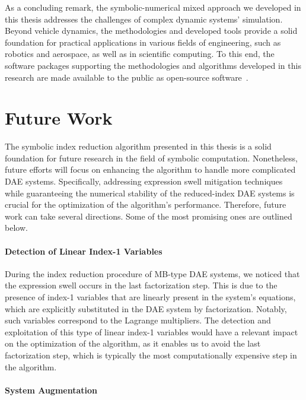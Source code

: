 As a concluding remark, the symbolic-numerical mixed approach we developed in this thesis addresses the challenges of complex dynamic systems' simulation. Beyond vehicle dynamics, the methodologies and developed tools provide a solid foundation for practical applications in various fields of engineering, such as robotics and aerospace, as well as in scientific computing. To this end, the software packages supporting the methodologies and algorithms developed in this research are made available to the public as open-source software~\cite{acme, enve, lime, limerickey, lem, last, indigo, trussme}.

\section{Future Work}
\label{chap6:sec:future_work}

The symbolic index reduction algorithm presented in this thesis is a solid foundation for future research in the field of symbolic computation. Nonetheless, future efforts will focus on enhancing the algorithm to handle more complicated \ac{DAE} systems. Specifically, addressing expression swell mitigation techniques while guaranteeing the numerical stability of the reduced-index \ac{DAE} systems is crucial for the optimization of the algorithm's performance. Therefore, future work can take several directions. Some of the most promising ones are outlined below.

\paragraph{Detection of Linear Index-1 Variables}

During the index reduction procedure of \ac{MB}-type \ac{DAE} systems, we noticed that the expression swell occurs in the last factorization step. This is due to the presence of index-1 variables that are linearly present in the system's equations, which are explicitly substituted in the \ac{DAE} system by factorization. Notably, such variables correspond to the Lagrange multipliers. The detection and exploitation of this type of linear index-1 variables would have a relevant impact on the optimization of the algorithm, as it enables us to avoid the last factorization step, which is typically the most computationally expensive step in the algorithm.

\paragraph{System Augmentation}

